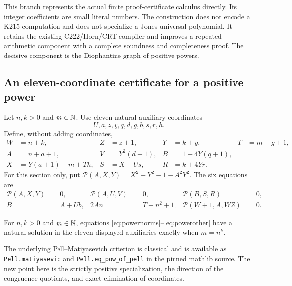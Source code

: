 This branch represents the actual finite proof-certificate calculus directly.
Its integer coefficients are small literal numbers. The construction does
not encode a K215 computation and does not specialize a Jones universal
polynomial. It retains the existing C222/Horn/CRT compiler and improves a
repeated arithmetic component with a complete soundness and completeness
proof. The decisive component is the Diophantine graph of positive powers.

\subsection{An eleven-coordinate certificate for a positive power}
Let $n,k>0$ and $m\in\mathbb N$. Use eleven natural auxiliary coordinates
\[
 U,a,z,y,q,d,g,b,s,r,h.
\]
Define, without adding coordinates,
\begin{align*}
 W&=n+k,&Z&=z+1,&Y&=k+y,&T&=m+g+1,\\
 A&=n+a+1,&V&=Y^2(d+1),&B&=1+4Y(q+1),\\
 X&=Y(a+1)+m+Th,&S&=X+Us,&R&=k+4Yr.
\end{align*}
For this section only, put
$\mathcal P(A,X,Y)=X^2+Y^2-1-A^2Y^2$. The six equations are
\begin{align}
 \mathcal P(A,X,Y)&=0,&\mathcal P(A,U,V)&=0,&\mathcal P(B,S,R)&=0,
 \label{eq:powernorms}\\
 B&=A+Ub,&2An&=T+n^2+1,&\mathcal P(W+1,A,WZ)&=0.
 \label{eq:powerother}
\end{align}

\begin{theorem}\label{thm:power}
For $n,k>0$ and $m\in\mathbb N$, equations
\eqref{eq:powernorms}--\eqref{eq:powerother} have a natural solution
in the eleven displayed auxiliaries exactly when $m=n^k$.
\end{theorem}

The underlying Pell--Matiyasevich criterion is classical and is available
as \texttt{Pell.matiyasevic} and \texttt{Pell.eq\_pow\_of\_pell}
in the pinned mathlib source\cite{mathlib}. The new point here is the
strictly positive specialization, the direction of the congruence
quotients, and exact elimination of coordinates.

